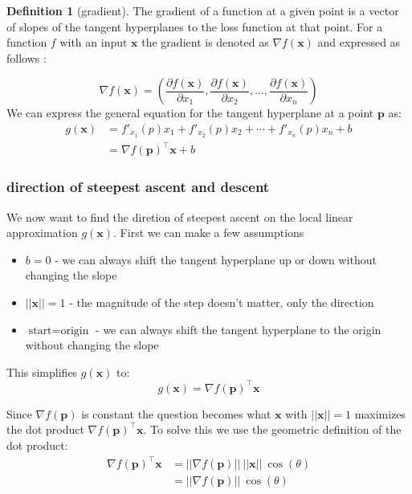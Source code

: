 \documentclass[12pt]{article}
\theoremstyle{definition}
\newtheorem{definition}{Definition}[section]
\begin{document}
\begin{definition}[gradient]
    The gradient of a function at a given point is a vector of slopes of the tangent hyperplanes to the loss function at that point. For a function $f$ with an input $\mathbf{x}$ the gradient is denoted as $\nabla f(\mathbf{x})$ and expressed as follows : 
\end{definition}
\begin{equation}
    \nabla f(\mathbf{x}) = \left(\frac{\partial f(\mathbf{x})}{\partial x_1}, \frac{\partial f(\mathbf{x})}{\partial x_2}, \ldots, \frac{\partial f(\mathbf{x})}{\partial x_n}\right)  
\end{equation}
We can express the general equation for the tangent hyperplane at a point $\mathbf{p}$ as: 
\begin{align*}
    g(\mathbf{x}) & = f'_{x_1}(p)x_1 + f'_{x_2}(p)x_2 + \cdots + f'_{x_n}(p)x_n + b \\
    & = \nabla f(\mathbf{p})^\intercal \mathbf{x} + b
\end{align*}
\subsubsection*{direction of steepest ascent and descent}
We now want to find the diretion of steepest ascent on the local linear approximation $g(\mathbf{x})$. First we can make a few assumptions 
\begin{itemize}[leftmargin=*, noitemsep]
    \item $b = 0$ - we can always shift the tangent hyperplane up or down without changing the slope
    \item $||\mathbf{x}|| = 1$ - the magnitude of the step doesn't matter, only the direction
    \item $\text{start} = \text{origin}$  - we can always shift the tangent hyperplane to the origin without changing the slope
\end{itemize}

This simplifies $g(\mathbf{x})$ to:
\begin{equation}
    g(\mathbf{x}) = \nabla f(\mathbf{p})^\intercal \mathbf{x}
\end{equation}

Since $\nabla f(\mathbf{p})$ is constant the question becomes what $\mathbf{x}$ with $||\mathbf{x}|| = 1$ maximizes the dot product $\nabla f(\mathbf{p})^\intercal \mathbf{x}$. To solve this we use the geometric definition of the dot product:
\begin{align*}
    \nabla f(\mathbf{p})^\intercal \mathbf{x} & = ||\nabla f(\mathbf{p})||\ ||\mathbf{x}|| \ \cos(\theta) \\
    & = ||\nabla f(\mathbf{p})|| \ \cos(\theta)
\end{align*}
\end{document}
